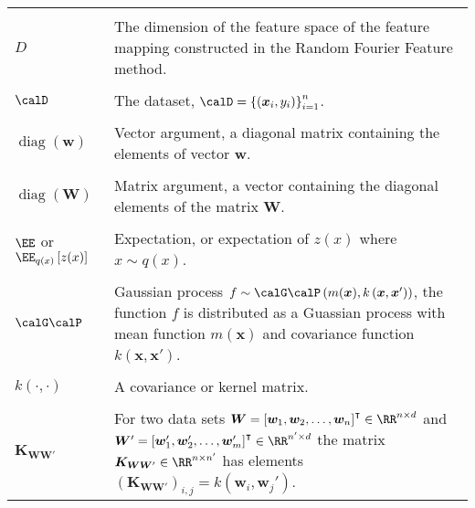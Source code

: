 \begin{longtable}{lp{}}
    \\\\
    $D$                                                                                                        & The dimension of the feature space of the feature mapping constructed in the Random Fourier Feature method.
    \\\\
    $\calD$                                                                                                    & The dataset, $\calD = \left\{ \left( \bm{x}_i , y_{i} \right) \right\}_{i=1}^{n}$.
    \\\\
    $\operatorname{diag} \left( \bm{w} \right)$                                                                & Vector argument, a diagonal matrix containing the elements of vector $\bm{w}$.
    \\\\
    $\operatorname{diag} \left( \bm{W} \right)$                                                                & Matrix argument, a vector containing the diagonal elements of the matrix $\bm{W}$.
    \\\\
    $\EE$ or $\EE_{q(x)} \left[ z(x) \right]$                                                                  & Expectation, or expectation of $z(x)$ where $x \sim q(x)$.
    \\\\
    $\calG \calP$                                                                                              & Gaussian process $f \sim \calG \calP \left( m (\bm{x}), k \left( \bm{x}, \bm{x}' \right) \right)$, the function $f$ is distributed as a Guassian process with mean function $m \left( \bm{x} \right)$ and covariance function $k \left( \bm{x}, \bm{x}' \right)$.
    \\\\
    $k \left( \cdot , \cdot \right)$                                                                           & A covariance or kernel matrix.
    \\\\
    $\bm{K}_{\bm{W} \bm{W}'}$                                                                                  & For two data sets $\bm{W} = \left[ \bm{w}_1 ,\bm{w}_2 , \ldots , \bm{w}_n \right]^{\intercal} \in \RR^{n \times d}$ and $\bm{W}' = \left[ \bm{w}_1' ,\bm{w}_2' , \ldots , \bm{w}_m' \right]^{\intercal} \in \RR^{n' \times d}$ the matrix \( \bm{K}_{\bm{W} \bm{W}'} \in \RR^{n \times n'} \) has elements $\left( \bm{K}_{\bm{W} \bm{W}'} \right)_{i,j} = k \left( \bm{w}_i , \bm{w}_j' \right)$.

\end{longtable}
